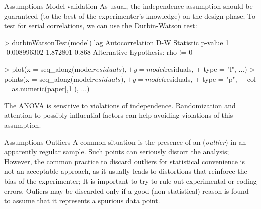 \documentclass[t]{beamer}
\begin{document}
\begin{ftstf}
{Assumptions}
{Model validation}
As usual, the independence assumption should be guaranteed (to the best of the experimenter's knowledge) on the design phase;
\vhalf
To test for serial correlations, we can use the Durbin-Watson test:
\vhalf
\begin{rcode}
> durbinWatsonTest(model)
 lag Autocorrelation D-W Statistic p-value
   1    -0.008996302      1.872801   0.868
 Alternative hypothesis: rho != 0

> plot(x    = seq_along(model$residuals),
+      y    = model$residuals,
+      type = "l", ...)
> points(x    = seq_along(model$residuals),
+        y    = model$residuals,
+        type = "p",
+        col  = as.numeric(paper[,1]), ...)
\end{rcode}
\vhalf
The ANOVA is sensitive to violations of independence. Randomization and attention to possibly influential factors can help avoiding violations of this assumption.
\end{ftstf}


\begin{ftst}
{Assumptions}
{Outliers}
A common situation is the presence of an (\textit{outlier}) in an apparently regular sample. Such points can seriously distort the analysis;
\vone
However, the common practice to discard outliers for statistical convenience is not an acceptable approach, as it usually leads to distortions that reinforce the bias of the experimenter;
\vone
It is important to try to rule out experimental or coding errors. Ouliers may be discarded only if a good (non-statistical) reason is found to assume that it represents a spurious data point.
\end{ftst}
\end{document}
